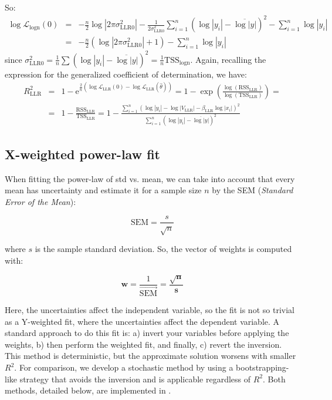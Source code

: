So:
\begin{eqnarray*}
\log\mathcal{L}_\text{logn}(0) &=& -\frac{n}{2}\log\left|2\pi\sigma^2_\text{LLR0}\right| - \frac{1}{2\sigma^2_\text{LLR0}}\sum_{i=1}^n\left(\log|y_i|-\overline{\log|y|}\right)^2 - \sum_{i=1}^n\log|y_i|\\
 &=& -\frac{n}{2}\left(\log\left|2\pi\sigma^2_\text{LLR0}\right| + 1 \right) - \sum_{i=1}^n\log|y_i|
\end{eqnarray*}
since $\sigma^2_\text{LLR0}=\frac{1}{n}\sum\left(\log|y_i|-\overline{\log|y|}\right)^2=\frac{1}{n}\mathrm{TSS}_\text{logn}$. Again, recalling the expression for the generalized coefficient of determination, we have:
\begin{eqnarray*}
R^2_\text{LLR} &=& 1 - \mathrm{e}^{\frac{2}{n}\left(\log\mathcal{L}_\text{LLR}(0)-\log\mathcal{L}_\text{LLR}(\hat\theta)\right)} = 1 - \exp{\left(\frac{\log(\mathrm{RSS}_\text{LLR})}{\log(\mathrm{TSS}_\text{LLR})}\right)}
 =\\ &=& 1 - \frac{\mathrm{RSS}_\text{LLR}}{\mathrm{TSS}_\text{LLR}} =
 1 - \frac{\sum_{i=1}^n\left(\log|y_i|-\log|V_\text{LLR}|-\beta_\text{LLR}\log|x_i|\right)^2}{\sum_{i=1}^n\left(\log|y_i|-\overline{\log|y|}\right)^2}
\end{eqnarray*}


\subsection*{X-weighted power-law fit}\label{sec:X-w}

When fitting the power-law of std vs. mean, we can take into account that every mean has uncertainty and estimate it for a sample size $n$ by the SEM (\emph{Standard Error of the Mean}):
\begin{linenomath}
$$ \mathrm{SEM} = \frac{s}{\sqrt{n}}$$
\end{linenomath}
where $s$ is the sample standard deviation. So, the vector of weights is computed with:
\begin{linenomath}
$$ \mathbf{w} = \frac{1}{\overrightarrow{\mathrm{SEM}}} = \frac{\sqrt{\mathbf{n}}}{\mathbf{s}}$$
\end{linenomath}

Here, the uncertainties affect the independent variable, so the fit is not so trivial as a Y-weighted fit, where the uncertainties affect the dependent variable. A standard approach to do this fit is: a) invert your variables before applying the weights, b) then perform the weighted fit, and finally, c) revert the inversion. This method is deterministic, but the approximate solution worsens with smaller $R^2$. For comparison, we develop a stochastic method by using a bootstrapping-like strategy that avoids the inversion and is applicable regardless of $R^2$. Both methods, detailed below, are implemented in \CC.


